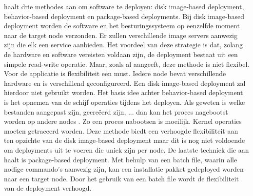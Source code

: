 \citet{deploymentMethods} haalt drie methodes aan om software te deployen: disk image-based deployment, behavior-based deployment en package-based deployments.
Bij disk image-based deployment worden de software en het besturingssysteem op eenzelfde moment naar de target node verzonden.
Er zullen verschillende image servers aanwezig zijn die elk een service aanbieden.
Het voordeel van deze strategie is dat, zolang de hardware en software vereisten voldaan zijn, de deployment bestaat uit een simpele read-write operatie.
Maar, zoals \citet{deploymentMethods} al aangeeft, deze methode is niet flexibel.
Voor de applicatie is flexibiliteit een must.
Iedere node bevat verschillende hardware en is verschillend geconfigureerd.
Een disk image-based deployment zal hierdoor niet gebruikt worden.
Het basis idee achter behavior-based deployment is het opnemen van de schijf operaties tijdens het deployen.
Als geweten is welke bestanden aangepast zijn, gecreëerd zijn, ... dan kan het proces nagebootst worden op andere nodes \citep{deploymentMethods}.
Zo een proces nabootsen is moeilijk.
Kernel operaties moeten getraceerd worden.
Deze methode biedt een verhoogde flexibiliteit aan ten opzichte van de disk image-based deployment maar dit is nog niet voldoende om deployments uit te voeren die uniek zijn per node.
De laatste techniek die \citet{deploymentMethods} aan haalt is package-based deployment.
Met behulp van een batch file, waarin alle nodige commando's aanwezig zijn, kan een installatie pakket gedeployed worden naar een target node.
Door het gebruik van een batch file wordt de flexibiliteit van de deployment verhoogd.

